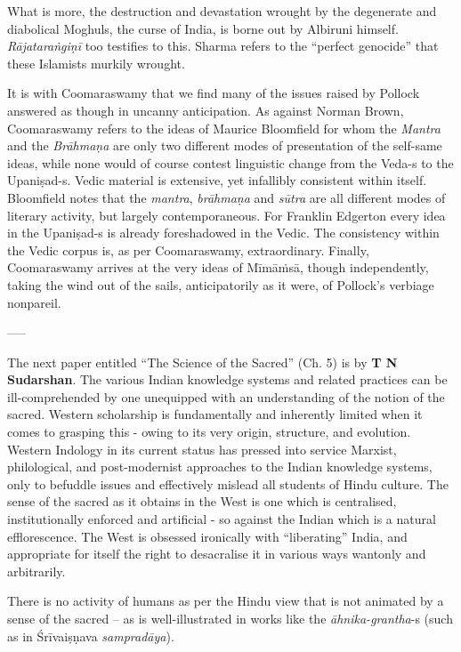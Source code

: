 What is more, the destruction and devastation wrought by the degenerate and diabolical Moghuls, the curse of India, is borne out by Albiruni himself. \textit{Rājataraṅgiṇī} too testifies to this. Sharma refers to the “perfect genocide” that these Islamists murkily wrought.

It is with Coomaraswamy that we find many of the issues raised by Pollock answered as though in uncanny anticipation. As against Norman Brown, Coomaraswamy refers to the ideas of Maurice Bloomfield for whom the \textit{Mantra} and the \textit{Brāhmaṇa} are only two different modes of presentation of the self-same ideas, while none would of course contest linguistic change from the Veda-s to the Upaniṣad-s. Vedic material is extensive, yet infallibly consistent within itself. Bloomfield notes that the \textit{mantra}, \textit{brāhmaṇa} and \textit{sūtra} are all different modes of literary activity, but largely contemporaneous. For Franklin Edgerton every idea in the Upaniṣad-s is already foreshadowed in the Vedic. The consistency within the Vedic corpus is, as per Coomaraswamy, extraordinary. Finally, Coomaraswamy arrives at the very ideas of Mīmāṁsā, though independently, taking the wind out of the sails, anticipatorily as it were, of Pollock's verbiage nonpareil. 

-----

The next paper entitled “The Science of the Sacred” (Ch. 5) is by \textbf{T N Sudarshan}. The various Indian knowledge systems and related practices can be ill-comprehended by one unequipped with an understanding of the notion of the sacred. Western scholarship is fundamentally and inherently limited when it comes to grasping this - owing to its very origin, structure, and evolution. Western Indology in its current status has pressed into service Marxist, philological, and post-modernist approaches to the Indian knowledge systems, only to befuddle issues and effectively mislead all students of Hindu culture. The sense of the sacred as it obtains in the West is one which is centralised, institutionally enforced and artificial - so against the Indian which is a natural efflorescence. The West is obsessed ironically with “liberating” India, and appropriate for itself the right to desacralise it in various ways wantonly and arbitrarily.

There is no activity of humans as per the Hindu view that is not animated by a sense of the sacred – as is well-illustrated in works like the \textit{āhnika-grantha}-s (such as in Śrīvaiṣṇava \textit{sampradāya}).

